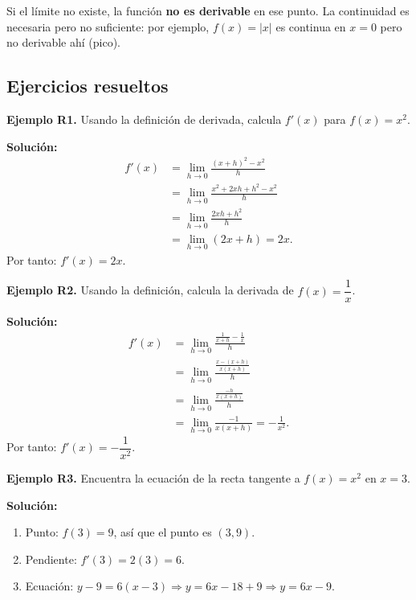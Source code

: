 \documentclass[12pt, a4paper]{article}
\begin{document}
\begin{cuadroadvertencia}
  Si el límite no existe, la función \textbf{no es derivable} en ese punto. La continuidad es necesaria pero no suficiente: por ejemplo, $f(x) = |x|$ es continua en $x = 0$ pero no derivable ahí (pico).
\end{cuadroadvertencia}

\subsection{Ejercicios resueltos}

\textbf{Ejemplo R1.} Usando la definición de derivada, calcula $f'(x)$ para $f(x) = x^2$.

\begin{cuadrosolucion}
  \textbf{Solución:}
  \begin{align*}
    f'(x) & = \lim_{h \to 0} \frac{(x + h)^2 - x^2}{h}       \\
          & = \lim_{h \to 0} \frac{x^2 + 2xh + h^2 - x^2}{h} \\
          & = \lim_{h \to 0} \frac{2xh + h^2}{h}             \\
          & = \lim_{h \to 0} (2x + h) = 2x.
  \end{align*}
  Por tanto: $f'(x) = 2x$.
\end{cuadrosolucion}

\textbf{Ejemplo R2.} Usando la definición, calcula la derivada de $f(x) = \dfrac{1}{x}$.

\begin{cuadrosolucion}
  \textbf{Solución:}
  \begin{align*}
    f'(x) & = \lim_{h \to 0} \frac{\frac{1}{x + h} - \frac{1}{x}}{h} \\
          & = \lim_{h \to 0} \frac{\frac{x - (x + h)}{x(x + h)}}{h}  \\
          & = \lim_{h \to 0} \frac{\frac{-h}{x(x + h)}}{h}           \\
          & = \lim_{h \to 0} \frac{-1}{x(x + h)} = -\frac{1}{x^2}.
  \end{align*}
  Por tanto: $f'(x) = -\dfrac{1}{x^2}$.
\end{cuadrosolucion}

\textbf{Ejemplo R3.} Encuentra la ecuación de la recta tangente a $f(x) = x^2$ en $x = 3$.

\begin{cuadrosolucion}
  \textbf{Solución:}
  \begin{enumerate}
    \item Punto: $f(3) = 9$, así que el punto es $(3, 9)$.
    \item Pendiente: $f'(3) = 2(3) = 6$.
    \item Ecuación: $y - 9 = 6(x - 3) \Rightarrow y = 6x - 18 + 9 \Rightarrow y = 6x - 9$.
  \end{enumerate}
\end{cuadrosolucion}
\end{document}
